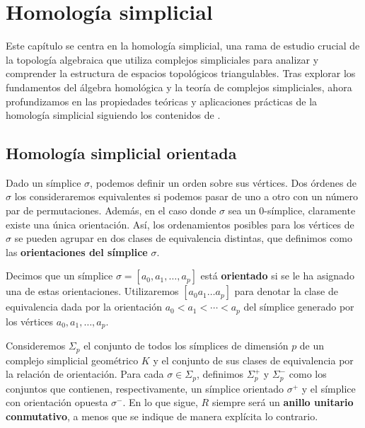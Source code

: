 
\chapter{Homología simplicial}
\label{chapter:homology}

Este capítulo se centra en la homología simplicial, una rama de estudio crucial
de la topología algebraica que utiliza complejos simpliciales para analizar y
comprender la estructura de espacios topológicos triangulables. Tras explorar los
fundamentos del álgebra homológica y la teoría de complejos simpliciales, ahora
profundizamos en las propiedades teóricas y aplicaciones prácticas de la
homología simplicial siguiendo los contenidos de \cite{rafael2003elementos}.

\section{Homología simplicial orientada}

Dado un símplice $\sigma$, podemos definir un orden sobre sus vértices. Dos órdenes
de $\sigma$ los consideraremos equivalentes si podemos pasar de uno a otro con un
número par de permutaciones. Además, en el caso donde $\sigma$ sea un $0$-símplice,
claramente existe una única orientación. Así, los ordenamientos posibles para
los vértices de $\sigma$ se pueden agrupar en dos clases de equivalencia
distintas, que definimos como las \textbf{orientaciones del símplice} $\sigma$.

\begin{definicion}
	Decimos que un símplice $\sigma = [a_{0}, a_{1}, \ldots, a_{p}]$ está \textbf{orientado}
	si se le ha asignado una de estas orientaciones. Utilizaremos $[a_{0}a_{1}\ldots
	a_{p}]$ para denotar la clase de equivalencia dada por la orientación $a_{0}< a
	_{1}< \cdots < a_{p}$ del símplice generado por los vértices $a_{0},a_{1},\ldots
	, a_{p}$.
\end{definicion}

Consideremos $\Sigma_{p}$ el conjunto de todos los símplices de dimensión $p$ de
un complejo simplicial geométrico $K$ y el conjunto de sus clases de equivalencia
por la relación de orientación. Para cada $\sigma \in \Sigma_{p}$, definimos $\Sigma
_{p}^{+}$ y $\Sigma_{p}^{-}$ como los conjuntos que contienen, respectivamente, un
símplice orientado $\sigma^{+}$ y el símplice con orientación opuesta $\sigma^{-}$.
En lo que sigue, $R$ siempre será un \textbf{anillo unitario conmutativo}, a menos
que se indique de manera explícita lo contrario.

